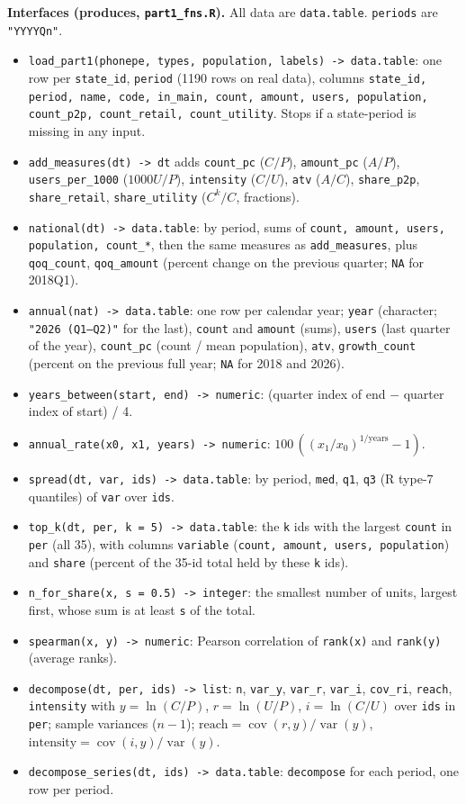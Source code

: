 \documentclass[10pt,a4paper]{article}
\newcommand{\f}[1]{\texttt{#1}}
\begin{document}
\textbf{Interfaces (produces, \f{part1\_fns.R}).} All data are \f{data.table}. \f{periods} are \f{"YYYYQn"}.
\begin{itemize}
\item \f{load\_part1(phonepe, types, population, labels) -> data.table}: one row per \f{state\_id}, \f{period}
      (1190 rows on real data), columns \f{state\_id, period, name, code, in\_main, count, amount, users,
      population, count\_p2p, count\_retail, count\_utility}. Stops if a state-period is missing in any input.
\item \f{add\_measures(dt) -> dt} adds \f{count\_pc} ($C/P$), \f{amount\_pc} ($A/P$), \f{users\_per\_1000}
      ($1000U/P$), \f{intensity} ($C/U$), \f{atv} ($A/C$), \f{share\_p2p}, \f{share\_retail},
      \f{share\_utility} ($C^k/C$, fractions).
\item \f{national(dt) -> data.table}: by period, sums of \f{count, amount, users, population, count\_*}, then the
      same measures as \f{add\_measures}, plus \f{qoq\_count}, \f{qoq\_amount} (percent change on the previous
      quarter; \f{NA} for 2018Q1).
\item \f{annual(nat) -> data.table}: one row per calendar year; \f{year} (character; \f{"2026 (Q1--Q2)"} for the
      last), \f{count} and \f{amount} (sums), \f{users} (last quarter of the year), \f{count\_pc} (count / mean
      population), \f{atv}, \f{growth\_count} (percent on the previous full year; \f{NA} for 2018 and 2026).
\item \f{years\_between(start, end) -> numeric}: (quarter index of end $-$ quarter index of start) / 4.
\item \f{annual\_rate(x0, x1, years) -> numeric}: $100\,((x_1/x_0)^{1/\text{years}} - 1)$.
\item \f{spread(dt, var, ids) -> data.table}: by period, \f{med}, \f{q1}, \f{q3} (R type-7 quantiles) of \f{var} over
      \f{ids}.
\item \f{top\_k(dt, per, k = 5) -> data.table}: the \f{k} ids with the largest \f{count} in \f{per} (all 35), with
      columns \f{variable} (\f{count, amount, users, population}) and \f{share} (percent of the 35-id total
      held by these \f{k} ids).
\item \f{n\_for\_share(x, s = 0.5) -> integer}: the smallest number of units, largest first, whose sum is at least
      \f{s} of the total.
\item \f{spearman(x, y) -> numeric}: Pearson correlation of \f{rank(x)} and \f{rank(y)} (average ranks).
\item \f{decompose(dt, per, ids) -> list}: \f{n}, \f{var\_y}, \f{var\_r}, \f{var\_i}, \f{cov\_ri}, \f{reach},
      \f{intensity} with $y=\ln(C/P)$, $r=\ln(U/P)$, $i=\ln(C/U)$ over \f{ids} in \f{per}; sample variances
      ($n-1$); $\text{reach} = \operatorname{cov}(r,y)/\operatorname{var}(y)$,
      $\text{intensity} = \operatorname{cov}(i,y)/\operatorname{var}(y)$.
\item \f{decompose\_series(dt, ids) -> data.table}: \f{decompose} for each period, one row per period.
\end{itemize}
\end{document}
